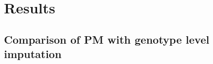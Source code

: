 \documentclass[a4paper,11pt]{report}
\begin{document}




\chapter{Results}

\section{Comparison of PM with genotype level imputation}
\end{document}
